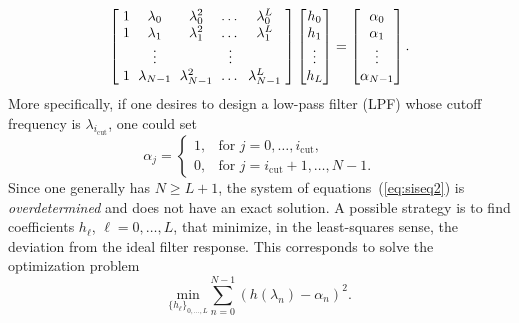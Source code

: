\begin{equation}\label{eq:siseq2}
    \setlength{\arraycolsep}{3pt}
    \left[\begin{array}{ccccc}
            1 & \lambda_0     & \lambda^2_0     & \dots  & \lambda^L_0     \\
            1 & \lambda_1     & \lambda^2_1     & \dots  & \lambda^L_1     \\
              & \vdots        &                 & \vdots &                 \\
            1 & \lambda_{N-1} & \lambda^2_{N-1} & \dots  & \lambda^L_{N-1} \\
        \end{array}\right]
    \begin{bmatrix}
        h_0    \\
        h_1    \\
        \vdots \\
        h_L
    \end{bmatrix} =
    \begin{bmatrix}
        \alpha_0 \\
        \alpha_1 \\
        \vdots   \\
        \alpha_{N-1}
    \end{bmatrix}.
\end{equation}
More specifically, if one desires to design a low-pass filter (LPF) whose cutoff frequency is $ \lambda_{i_\text{cut}} $, one could set
\begin{equation}
    \label{eq:alfas}
    \alpha_j =
    \left\{\begin{array}{ll}
        1, & \text{for } j = 0,\ldots, i_\text{cut},    \\
        0, & \text{for } j = i_\text{cut}+1,\ldots,N-1.
    \end{array}\right.
\end{equation}
Since one generally has $ N \geq L+1$, the system of equations~(\ref{eq:siseq2}) is \emph{overdetermined} and does not have an exact solution. A possible strategy is to find coefficients $ h_\ell $, $ \ell=0, \dots, L$, that minimize, in the least-squares sense, the deviation from the ideal filter response. This corresponds to solve the optimization problem
\begin{equation}
    \label{eq:opt}
    \underset{\{h_\ell\}_{0, \dots, L}}{\text{min}} \sum_{n=0}^{N-1} \left( h(\lambda_n) - \alpha_n \right)^2.
\end{equation}

